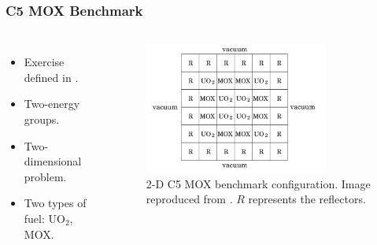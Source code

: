 \begin{frame}
\frametitle{C5 MOX Benchmark}

\begin{columns}
    \column[t]{4cm}
    \begin{itemize}
        \item Exercise defined in \cite{cavarec_benchmark_1994}.
        \item Two-energy groups.
        \item Two-dimensional problem.
        \item Two types of fuel: UO$_2$, MOX.
    \end{itemize}

    \column[t]{6cm}
    \begin{figure}[htbp!]
        \begin{center}
            \includegraphics[width=6cm]{figures/bench-config}
        \end{center}
        \caption{2-D C5 MOX benchmark configuration. Image reproduced from \cite{capilla_applications_2009}. $R$ represents the reflectors.}
    \end{figure}
\end{columns}
\end{frame}


